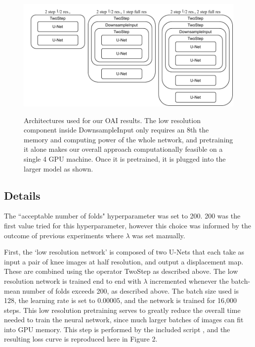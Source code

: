 \documentclass[10pt,onecolumn,letterpaper]{article} %
\begin{document}
\begin{figure}
    \centering
    \includegraphics{figs/ICON_OAI-4}\\
    \caption{Architectures used for our OAI results. The low resolution component inside DownsampleInput only requires an 8th the memory and computing power of the whole network, and pretraining it alone makes our overall approach computationally feasible on a single 4 GPU machine. Once it is pretrained, it is plugged into the larger model as shown.}
    \label{fig:oai-arc}
\end{figure}

\subsection{Details}

The ``acceptable number of folds" hyperparameter was set to 200. 200 was the first value tried for this hyperparameter, however this choice was informed by the outcome of previous experiments where $\lambda$ was set manually. 

First, the `low resolution network' is composed of two U-Nets that each take as input a pair of knee images at half resolution, and output a displacement map. These are combined using the operator TwoStep as described above. The low resolution network is trained end to end with $\lambda$ incremented whenever the batch-mean number of folds exceeds 200, as described above. The batch size used is 128, the learning rate is set to $0.00005$, and the network is trained for 16,000 steps. This low resolution pretraining serves to greatly reduce the overall time needed to train the neural network, since much larger batches of images can fit into GPU memory. This step is performed by the included script , and the resulting loss curve is reproduced here in Figure 2.
\end{document}
